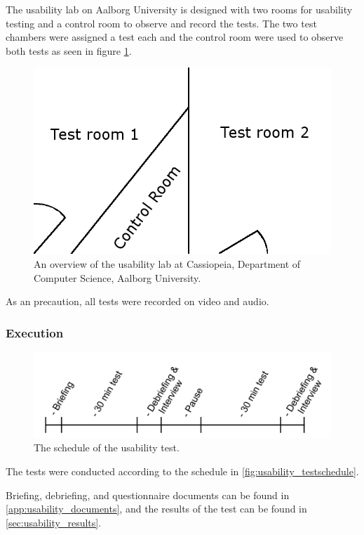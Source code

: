 The usability lab on Aalborg University is designed with two rooms for usability testing and a control room to observe and record the tests.
The two test chambers were assigned a test each and the control room were used to observe both tests as seen in figure \ref{fig:test_setup}.

\begin{figure}[H]
	\centering
		\includegraphics[width=\textwidth]{input/images/test_setup.png}
	\caption{An overview of the usability lab at Cassiopeia, Department of Computer Science, Aalborg University.}
	\label{fig:test_setup}
\end{figure}

As an precaution, all tests were recorded on video and audio.

\subsubsection*{Execution}

\begin{figure}[H]
	\centering
		\includegraphics[width=\textwidth]{input/images/usability_testschedule.png}
	\caption{The schedule of the usability test.}
	\label{fig:usability_testschedule}
\end{figure}

The tests were conducted according to the schedule in \autoref{fig:usability_testschedule}.

Briefing, debriefing, and questionnaire documents can be found in \autoref{app:usability_documents}, and the results of the test can be found in \autoref{sec:usability_results}.